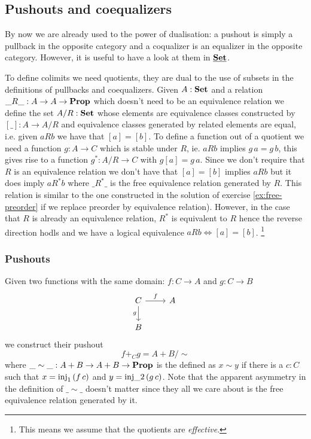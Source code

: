 \subsection{Pushouts and coequalizers}
\label{sec:push-coeq}

By now we are already used to the power of dualisation: a pushout is simply a pullback in the opposite category and a coqualizer is an equalizer in the opposite category. However, it is useful to have a look at them in $\underline{\mathbf{\mathbf{Set}}}$.

To define colimits we need quotients, they are dual to the use of subsets in the definitions of pullbacks and coequalizers. Given $A:\mathbf{Set}$ and a relation $\_R\_:A \to A \to \mathbf{Prop}$ which doesn't need to be an equivalence relation we define the set $A/R : \mathbf{Set}$ whose elements are equivalence classes constructed by $[\_] : A \to A/R$ and equivalence classes generated by related elements are equal, i.e. given $a R b$ we have that $[a] = [b]$. To define a function out of a quotient we need a function $g : A \to C$ which is stable under $R$, ie. $a R b$ implies $g\,a = g\,b$, this gives rise to a function $g^* : A/R \to C$ with $g [a] = g\, a$. Since we don't require that $R$ is an equivalence relation we don't have that $[a] = [b]$ implies $a R b$ but it does imply $a R^* b$ where $\_R^*\_$ is the free equivalence relation generated by $R$. This relation is similar to the one constructed in the solution of exercise \ref{ex:free-preorder} if we replace preorder by equivalence relation). However, in the case that $R$ is already an equivalence relation, $R^*$ is equivalent to $R$ hence the reverse direction hodls and we have a logical equivalence $ a R b \iff [ a ] = [ b ]$.
\footnote{This means we assume that the quotients are \emph{effective}.}

\subsubsection{Pushouts}
\label{sec:pushouts}

Given two functions with the same domain: $f : C \to A$ and $g : C \to B$ 
\[\begin{tikzcd}
C \arrow[r,"f"]\arrow[d,"g" left] & A \\
B  
\end{tikzcd}\]
we construct their pushout 
\[ f +_C g = A+B / \sim \]
where $\_\sim\_ : A+B \to A+B \to \mathbf{Prop}$ is the defined as $x \sim y$ if there is a $c:C$ such that $x = \mathrm{inj}_1\,(f\,c)$ and $y = \mathrm{inj}\_2\,(g\,c)$. Note that the apparent asymmetry in the definition of $\_\sim\_$ doesn't matter since they all we care about is the free equivalence relation generated by it.

